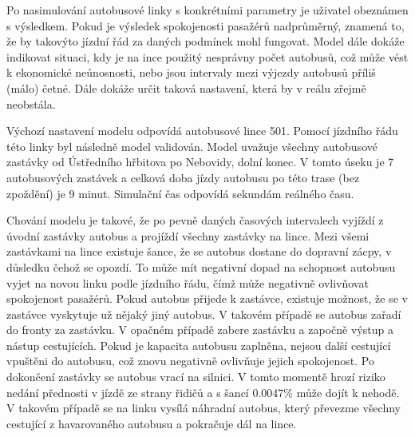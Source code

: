 \documentclass[a4paper]{article}
\begin{document}
         \begin{table}[H]
   			\centering
   			\caption{Ovlivnění celkové spokojenosti v závislosti na daném jevu (za každého jednoho pasažéra)}
   			\label{}
   		\end{table}
   		
     	Po nasimulování autobusové linky s konkrétními parametry je uživatel obeznámen s výsledkem. Pokud je výsledek spokojenosti pasažérů nadprůměrný, znamená to, že by takovýto jízdní řád za daných podmínek mohl fungovat. Model dále dokáže indikovat situaci, kdy je na ince použitý nesprávny počet autobusů, což může vést k ekonomické neúnosnosti, nebo jsou intervaly mezi výjezdy autobusů příliš (málo) četné. Dále dokáže určit taková nastavení, která by v reálu zřejmě neobstála.
   		
   		Výchozí nastavení modelu odpovídá autobusové lince 501. Pomocí jízdního řádu této linky byl následně model validován. 
 		Model uvažuje všechny autobusové zastávky od Ústředního hřbitova po Nebovidy, dolní konec. V tomto úseku je 7 autobusových zastávek a celková doba jízdy autobusu po této trase (bez zpoždění) je 9 minut. Simulační čas odpovídá sekundám reálného času. 
 		
 		Chování modelu je takové, že po pevně daných časových intervalech vyjíždí z úvodní zastávky autobus a projíždí všechny zastávky na lince. Mezi všemi zastávkami na lince existuje šance, že se autobus dostane do dopravní zácpy, v důsledku čehož se opozdí. To může mít negativní dopad na schopnost autobusu vyjet na novou linku podle jízdního řádu, čímž může negativně ovlivňovat spokojenost pasažérů. Pokud autobus přijede k zastávce, existuje možnost, že se v zastávce vyskytuje už nějaký jiný autobus. V takovém případě se autobus zařadí do fronty za zastávku. V opačném případě zabere zastávku a započně výstup a nástup cestujících. Pokud je kapacita autobusu zaplněna, nejsou další cestující vpuštěni do autobusu, což znovu negativně ovlivňuje jejich spokojenost. Po dokončení zastávky se autobus vrací na silnici. V tomto momentě hrozí riziko nedání přednosti v jízdě ze strany řidičů a s šancí 0.0047\% může dojít k nehodě.
 		V takovém případě se na linku vysílá náhradní autobus, který převezme všechny cestující z havarovaného autobusu a pokračuje dál na lince. 
 		
\end{document}
